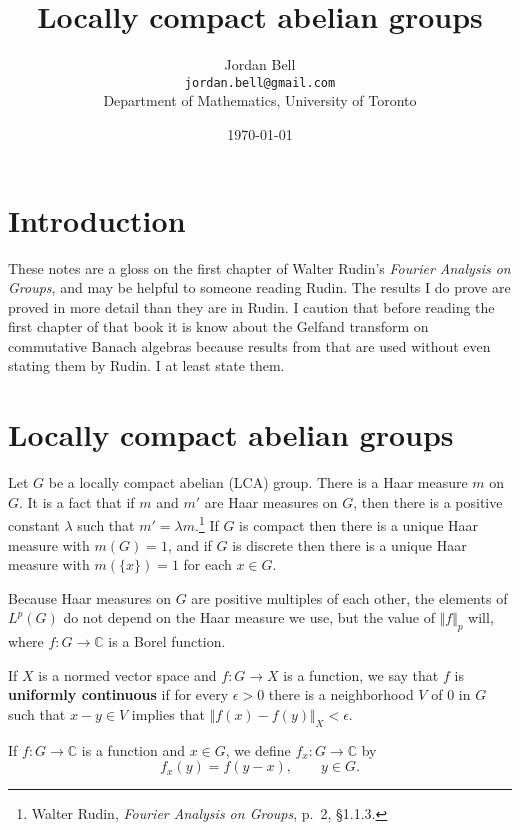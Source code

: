 \documentclass{article}
\newcommand{\norm}[1]{\Vert #1 \Vert}
\begin{document}
\title{Locally compact abelian groups}
\author{Jordan Bell\\ \texttt{jordan.bell@gmail.com}\\Department of Mathematics, University of Toronto}
\date{\today}
\maketitle

\section{Introduction}
These notes are a gloss on the first chapter of Walter Rudin's {\em Fourier Analysis on Groups}, and 
may be helpful to someone reading Rudin. The results I do prove are proved in more detail than they are in Rudin.
I caution that before reading the first chapter of that book 
it is know about the Gelfand transform on commutative Banach algebras
 because results from that are used without even stating them by Rudin. I at least state them.

\section{Locally compact abelian groups}
Let $G$ be a locally compact abelian (LCA) group. There is a Haar measure $m$ on $G$. 
It is a fact that if $m$ and $m'$ are Haar measures on $G$, then there is a positive constant $\lambda$ such that 
$m'=\lambda m$.\footnote{Walter Rudin, {\em Fourier Analysis on Groups}, p.~2, \S 1.1.3.}
If $G$ is compact
then there is a unique Haar measure with $m(G)=1$, and if $G$ is discrete then there is a unique Haar measure
with $m(\{x\})=1$ for each $x \in G$.




Because Haar measures on $G$ are positive multiples of each other,
the elements of $L^p(G)$ do not depend on the Haar measure we use, but the value of
$\norm{f}_p$ will, where   $f:G \to \mathbb{C}$ is a  Borel function.

If $X$ is a normed vector space and $f:G \to X$ is a function, we say that $f$ is \textbf{uniformly continuous}
if for every $\epsilon>0$ there is a neighborhood $V$ of $0$ in $G$ such that $x-y \in V$ implies that
$\norm{f(x)-f(y)}_X < \epsilon$.

If $f:G \to \mathbb{C}$ is a function and $x \in G$, we define $f_x:G \to \mathbb{C}$ by 
\[
f_x(y)=f(y-x), \qquad y \in G.
\]
\end{document}
